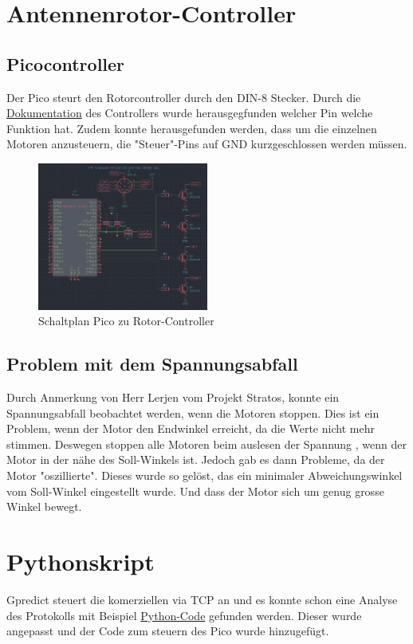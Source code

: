 \documentclass{article}
\begin{document}
\section*{Antennenrotor-Controller}
\subsection*{Picocontroller}
Der Pico steurt den Rotorcontroller durch den DIN-8 Stecker. Durch die \textcolor{blue}{\href{https://dk3wn.info/wp/wp-content/uploads/2018/10/kr5400.pdf}{Dokumentation}} des Controllers wurde herausgegfunden welcher Pin welche Funktion hat. Zudem konnte herausgefunden werden, dass um die einzelnen Motoren anzusteuern, die "Steuer"-Pins auf GND kurzgeschlossen werden müssen.

\begin{figure}[h]
\includegraphics[width=0.5\textwidth]{Wiring}
\centering 
\caption{Schaltplan Pico zu Rotor-Controller}
\end{figure}

\subsection*{Problem mit dem Spannungsabfall}
Durch Anmerkung von Herr Lerjen vom Projekt Stratos, konnte ein Spannungsabfall beobachtet werden, wenn die Motoren stoppen. Dies ist ein Problem, wenn der Motor den Endwinkel erreicht, da die Werte nicht mehr stimmen. Deswegen stoppen alle Motoren beim auslesen der Spannung , wenn der Motor in der nähe des Soll-Winkels ist. Jedoch gab es dann Probleme, da der Motor "oszillierte". Dieses wurde so gelöst, das ein minimaler Abweichungswinkel vom Soll-Winkel eingestellt wurde. Und dass der Motor sich um genug grosse Winkel bewegt.

\section*{Pythonskript}
Gpredict steuert die komerziellen via TCP an und es konnte schon eine Analyse des Protokolls mit Beispiel \textcolor{blue}{\href{https://adventurist.me/posts/0136}{Python-Code}} gefunden werden. Dieser wurde angepasst und der Code zum steuern des Pico wurde hinzugefügt.
\end{document}
